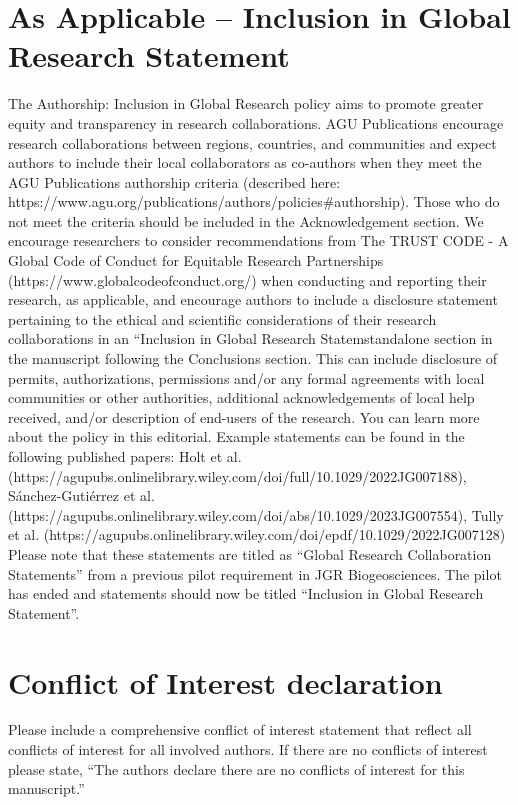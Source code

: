 \documentclass[draft]{agujournal2019}
\begin{document}
\section*{As Applicable – Inclusion in Global Research Statement}
The Authorship: Inclusion in Global Research policy aims to promote greater equity and transparency in research collaborations. AGU Publications encourage research collaborations between regions, countries, and communities and expect authors to include their local collaborators as co-authors when they meet the AGU Publications authorship criteria (described here: https://www.agu.org/publications/authors/policies\#authorship). Those who do not meet the criteria should be included in the Acknowledgement section. We encourage researchers to consider recommendations from The TRUST CODE - A Global Code of Conduct for Equitable Research Partnerships (https://www.globalcodeofconduct.org/) when conducting and reporting their research, as applicable, and encourage authors to include a disclosure statement pertaining to the ethical and scientific considerations of their research collaborations in an “Inclusion in Global Research Statemstandalone section in the manuscript following the Conclusions section. This can include disclosure of permits, authorizations, permissions and/or any formal agreements with local communities or other authorities, additional acknowledgements of local help received, and/or description of end-users of the research. You can learn more about the policy in this editorial. Example statements can be found in the following published papers: 
Holt et al. (https://agupubs.onlinelibrary.wiley.com/doi/full/10.1029/2022JG007188), 
Sánchez-Gutiérrez et al. (https://agupubs.onlinelibrary.wiley.com/doi/abs/10.1029/2023JG007554), 
Tully et al. (https://agupubs.onlinelibrary.wiley.com/doi/epdf/10.1029/2022JG007128) 
Please note that these statements are titled as “Global Research Collaboration Statements” from a previous pilot requirement in JGR Biogeosciences. The pilot has ended and statements should now be titled “Inclusion in Global Research Statement”.

\section*{Conflict of Interest declaration}
Please include a comprehensive conflict of interest statement that reflect all conflicts of interest for all involved authors. If there are no conflicts of interest please state, “The authors declare there are no conflicts of interest for this manuscript.”
\end{document}
